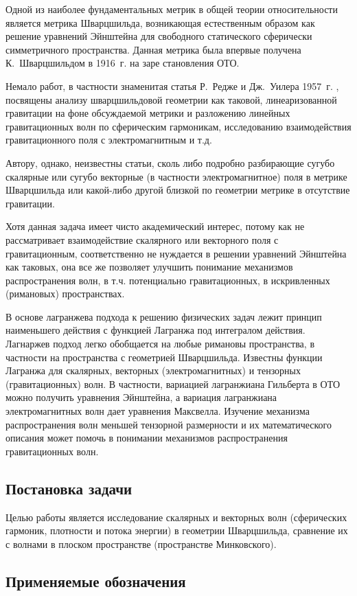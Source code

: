 \documentclass[\docroot/reports/draft/report.tex]{subfiles}
\begin{document}
\onlyinsubfile{\tableofcontents}

Одной из наиболее фундаментальных метрик в общей теории относительности является метрика Шварцшильда, возникающая естественным образом как решение уравнений Эйнштейна для свободного статического сферически симметричного пространства. Данная метрика была впервые получена К.~Шварцшильдом в 1916~г. \cite{schwarzschild_free_space_rus} на заре становления ОТО.

Немало работ, в частности знаменитая статья Р.~Редже и Дж.~Уилера 1957~г. \cite{regge_wheeler_1957}, посвящены анализу шварцшильдовой геометрии как таковой, линеаризованной гравитации на фоне обсуждаемой метрики и разложению линейных гравитационных волн по сферическим гармоникам, исследованию взаимодействия гравитационного поля с электромагнитным и т.д.

Автору, однако, неизвестны статьи, сколь либо подробно разбирающие сугубо скалярные или сугубо векторные (в частности электромагнитное) поля в метрике Шварцшильда или какой-либо другой близкой по геометрии метрике в отсутствие гравитации.

Хотя данная задача имеет чисто академический интерес, потому как не рассматривает взаимодействие скалярного или векторного поля с гравитационным, соответственно не нуждается в решении уравнений Эйнштейна как таковых, она все же позволяет улучшить понимание механизмов распространения волн, в т.ч. потенциально гравитационных, в искривленных (римановых) пространствах.

В основе лагранжева подхода к решению физических задач лежит принцип наименьшего действия с функцией Лагранжа под интегралом действия. Лагнаржев подход легко обобщается на любые римановы пространства, в частности на пространства с геометрией Шварцшильда. Известны функции Лагранжа для скалярных, векторных (электромагнитных) и тензорных (гравитационных) волн. В частности, вариацией лагранжиана Гильберта в ОТО можно получить уравнения Эйнштейна, а вариация лагранжиана электромагнитных волн дает уравнения Максвелла. Изучение механизма распространения волн меньшей тензорной размерности и их математического описания может помочь в понимании механизмов распространения гравитационных волн.

\subsection{Постановка задачи}

Целью работы является исследование скалярных и векторных волн (сферических гармоник, плотности и потока энергии) в геометрии Шварцшильда, сравнение их с волнами в плоском пространстве (пространстве Минковского).

\subsection{Применяемые обозначения}\label{seq:notation}


\end{document}
